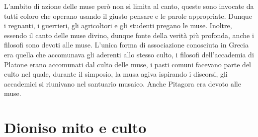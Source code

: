 \documentclass[10pt,a4paper]{article}
\begin{document}
L'ambito di azione delle muse però non si limita al canto, queste sono invocate da tutti coloro che operano usando il giusto pensare e le parole appropriate. Dunque i regnanti, i guerrieri, gli agricoltori e gli studenti pregano le muse. Inoltre, essendo il canto delle muse divino, dunque fonte della verità più profonda, anche i filosofi sono devoti alle muse. L'unica forma di associazione conosciuta in Grecia era quella che accomunava gli aderenti allo stesso culto, i filosofi dell'accademia di Platone erano accomunati dal culto delle muse, i pasti comuni facevano parte del culto nel quale, durante il simposio, la musa agiva ispirando i discorsi, gli accademici si riunivano nel santuario musaico. Anche Pitagora era devoto alle muse.
\newpage
\section{Dioniso mito e culto}
\end{document}
